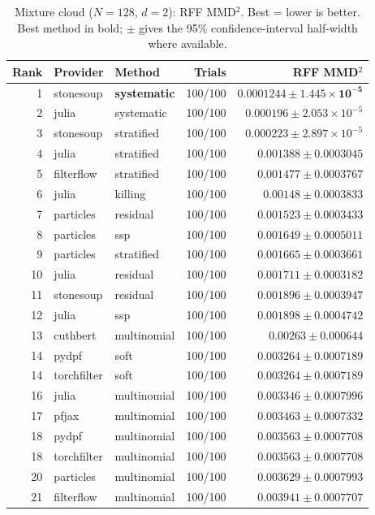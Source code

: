 \begin{table}[!htbp]
\centering
\small
\caption{Mixture cloud ($N=128$, $d=2$): RFF MMD$^2$. Best = lower is better. Best method in bold; $\pm$ gives the 95\% confidence-interval half-width where available.}
\label{tab:mixture-cloud-rff-mmd2}
\begin{tabular}{rllrr}
\toprule
Rank & Provider & Method & Trials & RFF MMD$^2$ \\
\midrule
1 & stonesoup & \textbf{systematic} & 100/100 & $\mathbf{0.0001244 \pm 1.445\times10^{-5}}$ \\
2 & julia & systematic & 100/100 & $0.000196 \pm 2.053\times10^{-5}$ \\
3 & stonesoup & stratified & 100/100 & $0.000223 \pm 2.897\times10^{-5}$ \\
4 & julia & stratified & 100/100 & $0.001388 \pm 0.0003045$ \\
5 & filterflow & stratified & 100/100 & $0.001477 \pm 0.0003767$ \\
6 & julia & killing & 100/100 & $0.00148 \pm 0.0003833$ \\
7 & particles & residual & 100/100 & $0.001523 \pm 0.0003433$ \\
8 & particles & ssp & 100/100 & $0.001649 \pm 0.0005011$ \\
9 & particles & stratified & 100/100 & $0.001665 \pm 0.0003661$ \\
10 & julia & residual & 100/100 & $0.001711 \pm 0.0003182$ \\
11 & stonesoup & residual & 100/100 & $0.001896 \pm 0.0003947$ \\
12 & julia & ssp & 100/100 & $0.001898 \pm 0.0004742$ \\
13 & cuthbert & multinomial & 100/100 & $0.00263 \pm 0.000644$ \\
14 & pydpf & soft & 100/100 & $0.003264 \pm 0.0007189$ \\
14 & torchfilter & soft & 100/100 & $0.003264 \pm 0.0007189$ \\
16 & julia & multinomial & 100/100 & $0.003346 \pm 0.0007996$ \\
17 & pfjax & multinomial & 100/100 & $0.003463 \pm 0.0007332$ \\
18 & pydpf & multinomial & 100/100 & $0.003563 \pm 0.0007708$ \\
18 & torchfilter & multinomial & 100/100 & $0.003563 \pm 0.0007708$ \\
20 & particles & multinomial & 100/100 & $0.003629 \pm 0.0007993$ \\
21 & filterflow & multinomial & 100/100 & $0.003941 \pm 0.0007707$ \\

\end{tabular}
\end{table}
